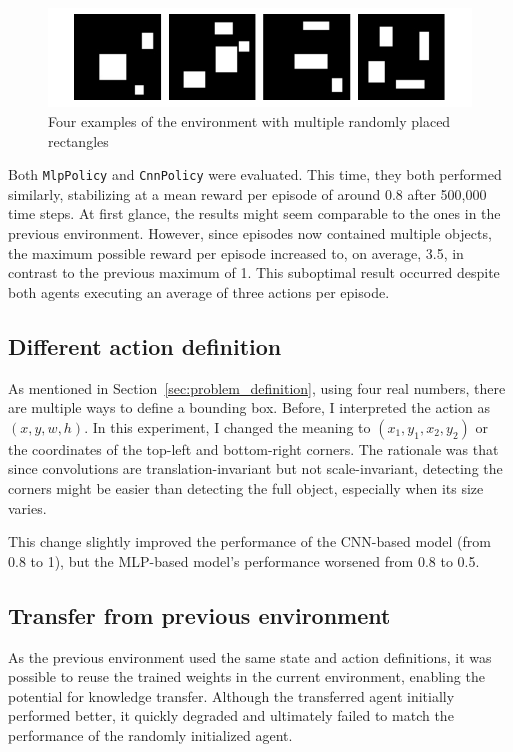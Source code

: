 \documentclass[
  digital,     %
  oneside,     %
  nosansbold,  %
  nocolorbold, %
  lof,         %
  lot,         %
]{fithesis4}
\begin{document}
\begin{figure}
    \includegraphics[width=1\linewidth]{env_examples/env3.pdf}
    \caption{Four examples of the environment with multiple randomly placed rectangles}
    \label{fig:env3}
\end{figure}

Both \texttt{MlpPolicy} and \texttt{CnnPolicy} were evaluated. This time, they both performed similarly, stabilizing at a mean reward per episode of around 0.8 after 500,000 time steps. At first glance, the results might seem comparable to the ones in the previous environment. However, since episodes now contained multiple objects, the maximum possible reward per episode increased to, on average, 3.5, in contrast to the previous maximum of 1. This suboptimal result occurred despite both agents executing an average of three actions per episode.

\subsection{Different action definition}
\label{subsec:different_rect_repr}

As mentioned in Section~\ref{sec:problem_definition}, using four real numbers, there are multiple ways to define a bounding box. Before, I interpreted the action as $(x, y, w, h)$. In this experiment, I changed the meaning to $(x_1, y_1, x_2, y_2)$ or the coordinates of the top-left and bottom-right corners. The rationale was that since convolutions are translation-invariant but not scale-invariant, detecting the corners might be easier than detecting the full object, especially when its size varies.

This change slightly improved the performance of the CNN-based model (from 0.8 to 1), but the MLP-based model's performance worsened from 0.8 to 0.5.

\subsection{Transfer from previous environment}

As the previous environment used the same state and action definitions, it was possible to reuse the trained weights in the current environment, enabling the potential for knowledge transfer. Although the transferred agent initially performed better, it quickly degraded and ultimately failed to match the performance of the randomly initialized agent.
\end{document}
